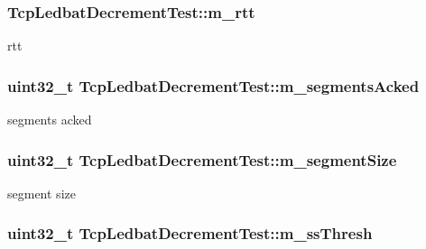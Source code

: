 \subsubsection[{\texorpdfstring{m\+\_\+rtt}{m_rtt}}]{ Tcp\+Ledbat\+Decrement\+Test\+::m\+\_\+rtt\hspace{0.3cm}{\ttfamily [private]}}\hypertarget{classTcpLedbatDecrementTest_a6fd1227eb486b0a2fdb850568af6ad2e}{}\label{classTcpLedbatDecrementTest_a6fd1227eb486b0a2fdb850568af6ad2e}


rtt 

\subsubsection[{\texorpdfstring{m\+\_\+segments\+Acked}{m_segmentsAcked}}]{\setlength{\rightskip}{0pt plus 5cm}uint32\+\_\+t Tcp\+Ledbat\+Decrement\+Test\+::m\+\_\+segments\+Acked\hspace{0.3cm}{\ttfamily [private]}}\hypertarget{classTcpLedbatDecrementTest_a9edb5e46382792a3df7263d7f651e140}{}\label{classTcpLedbatDecrementTest_a9edb5e46382792a3df7263d7f651e140}


segments acked 

\subsubsection[{\texorpdfstring{m\+\_\+segment\+Size}{m_segmentSize}}]{\setlength{\rightskip}{0pt plus 5cm}uint32\+\_\+t Tcp\+Ledbat\+Decrement\+Test\+::m\+\_\+segment\+Size\hspace{0.3cm}{\ttfamily [private]}}\hypertarget{classTcpLedbatDecrementTest_a4b9ceb7f0c9b5d5cc8ff8cd6da07f5f4}{}\label{classTcpLedbatDecrementTest_a4b9ceb7f0c9b5d5cc8ff8cd6da07f5f4}


segment size 

\subsubsection[{\texorpdfstring{m\+\_\+ss\+Thresh}{m_ssThresh}}]{\setlength{\rightskip}{0pt plus 5cm}uint32\+\_\+t Tcp\+Ledbat\+Decrement\+Test\+::m\+\_\+ss\+Thresh\hspace{0.3cm}{\ttfamily [private]}}\hypertarget{classTcpLedbatDecrementTest_a4e7dbc53af600ec7551863e04b3d72a4}{}\label{classTcpLedbatDecrementTest_a4e7dbc53af600ec7551863e04b3d72a4}


